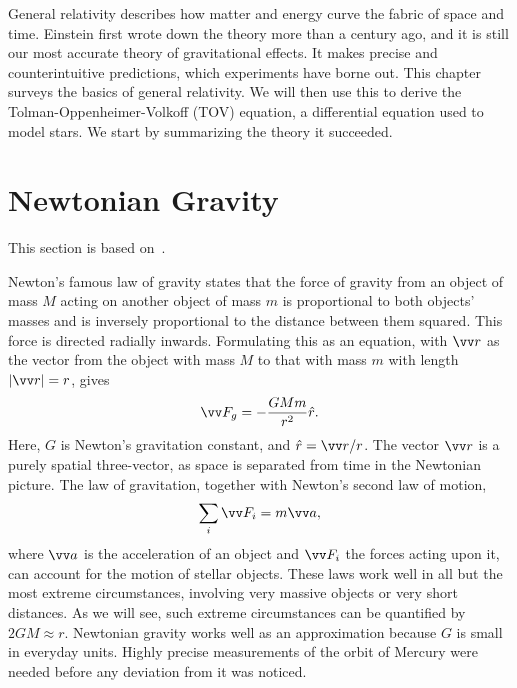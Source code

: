 General relativity describes how matter and energy curve the fabric of space and time.
Einstein first wrote down the theory more than a century ago, and it is still our most accurate theory of gravitational effects.
It makes precise and counterintuitive predictions, which experiments have borne out.
This chapter surveys the basics of general relativity.
We will then use this to derive the Tolman-Oppenheimer-Volkoff (TOV) equation, a differential equation used to model stars.
We start by summarizing the theory it succeeded.


\section{Newtonian Gravity}

This section is based on~\autocite{carrollSpacetimeGeometryIntroduction2019}.


Newton's famous law of gravity states that the force of gravity from an object of mass $M$ acting on another object of mass $m$ is proportional to both objects' masses and is inversely proportional to the distance between them squared.
This force is directed radially inwards.
Formulating this as an equation, with $\vv r$ as the vector from the object with mass $M$ to that with mass $m$ with length $|\vv r| = r$, gives
%
\begin{equation}
    \vv F_g = - \frac{G M m}{r^2} \hat r.
\end{equation}
%
Here, $G$ is Newton's gravitation constant, and $\hat r = \vv r / r$.
The vector $\vv r$ is a purely spatial three-vector, as space is separated from time in the Newtonian picture.
The law of gravitation, together with Newton's second law of motion,
%
\begin{equation}
    \label{Newton's second law}
    \sum_i \vv F_i = m \vv a,
\end{equation}
%
where $\vv a$ is the acceleration of an object and $\vv F_i$ the forces acting upon it, can account for the motion of stellar objects.
These laws work well in all but the most extreme circumstances, involving very massive objects or very short distances.
As we will see, such extreme circumstances can be quantified by $2G M \approx r$.
Newtonian gravity works well as an approximation because $G$ is small in everyday units.
Highly precise measurements of the orbit of Mercury were needed before any deviation from it was noticed.

